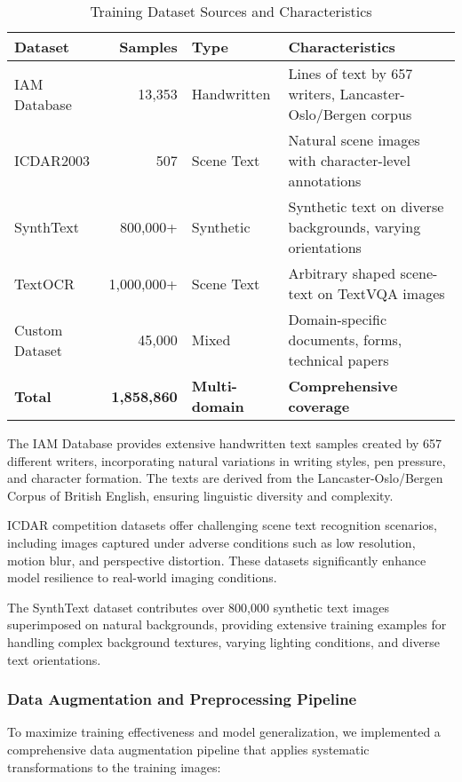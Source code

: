 \begin{table}[H]
\centering
\caption{Training Dataset Sources and Characteristics}
\label{tab:training_datasets}
\begin{tabular}{|l|r|l|p{4cm}|}
\hline
\textbf{Dataset} & \textbf{Samples} & \textbf{Type} & \textbf{Characteristics} \\
\hline
IAM Database & 13,353 & Handwritten & Lines of text by 657 writers, Lancaster-Oslo/Bergen corpus \\
\hline
ICDAR2003 & 507 & Scene Text & Natural scene images with character-level annotations \\
\hline
SynthText & 800,000+ & Synthetic & Synthetic text on diverse backgrounds, varying orientations \\
\hline
TextOCR & 1,000,000+ & Scene Text & Arbitrary shaped scene-text on TextVQA images \\
\hline
Custom Dataset & 45,000 & Mixed & Domain-specific documents, forms, technical papers \\
\hline
\textbf{Total} & \textbf{1,858,860} & \textbf{Multi-domain} & \textbf{Comprehensive coverage} \\
\hline
\end{tabular}
\end{table}

The IAM Database provides extensive handwritten text samples created by 657 different writers, incorporating natural variations in writing styles, pen pressure, and character formation. The texts are derived from the Lancaster-Oslo/Bergen Corpus of British English, ensuring linguistic diversity and complexity.

ICDAR competition datasets offer challenging scene text recognition scenarios, including images captured under adverse conditions such as low resolution, motion blur, and perspective distortion. These datasets significantly enhance model resilience to real-world imaging conditions.

The SynthText dataset contributes over 800,000 synthetic text images superimposed on natural backgrounds, providing extensive training examples for handling complex background textures, varying lighting conditions, and diverse text orientations.

\subsubsection{Data Augmentation and Preprocessing Pipeline}

To maximize training effectiveness and model generalization, we implemented a comprehensive data augmentation pipeline that applies systematic transformations to the training images:

